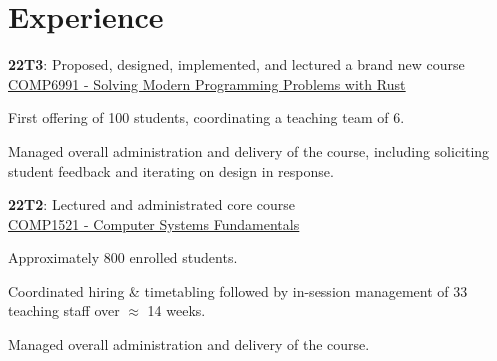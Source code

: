 \documentclass[a4paper]{deedy-resume}
\begin{document}
\begin{minipage}[t]{0.63\textwidth}


\section{Experience}


\vspace{\topsep} %
\begin{tightitemize}
\item
	\textbf{22T3}: Proposed, designed, implemented, and lectured
	a brand new course \\
	\href{https://www.handbook.unsw.edu.au/undergraduate/courses/current/COMP6991}
		 {\underline{COMP6991 - Solving Modern Programming Problems with Rust}}
\item First offering of 100 students, coordinating a teaching team of 6.
\item Managed overall administration and delivery of the course,
	  including soliciting student feedback and
	  iterating on design in response.
\item
	\textbf{22T2}: Lectured and administrated core course \\
	\href{https://www.handbook.unsw.edu.au/undergraduate/courses/current/COMP1521}
		 {\underline{COMP1521 - Computer Systems Fundamentals}}
\item Approximately 800 enrolled students.
\item Coordinated hiring \& timetabling followed by
	  in-session management of 33 teaching staff over $\approx$ 14 weeks.
\item Managed overall administration and delivery of the course.
\end{tightitemize}

\sectionspace




\end{minipage}
\end{document}
